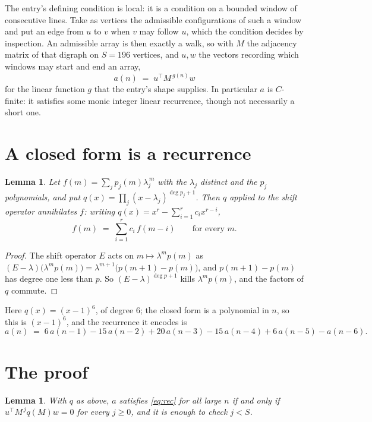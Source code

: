 \documentclass[11pt,a4paper]{article}
\theoremstyle{plain}
\newtheorem{lemma}[theorem]{Lemma}
\theoremstyle{definition}
\begin{document}
The entry's defining condition is local: it is a condition on a bounded window of consecutive lines. Take as vertices the
admissible configurations of such a window and put an edge from $u$ to $v$ when $v$ may
follow $u$, which the condition decides by inspection. An admissible array is then exactly a
walk, so with $M$ the adjacency matrix of that digraph on $S=196$ vertices, and $u,w$ the
vectors recording which windows may start and end an array,
\[
a(n)\;=\;u^{\!\top}M^{\,g(n)}w
\]
for the linear function $g$ that the entry's shape supplies. In particular $a$ is
$C$-finite: it satisfies some monic integer linear recurrence, though not necessarily a short
one.

\section{A closed form is a recurrence}

\begin{lemma}\label{lem:ann}
Let $f(m)=\sum_{j}p_j(m)\lambda_j^{\,m}$ with the $\lambda_j$ distinct and the $p_j$
polynomials, and put $q(x)=\prod_j(x-\lambda_j)^{\deg p_j+1}$. Then $q$ applied to the shift
operator annihilates $f$: writing $q(x)=x^{r}-\sum_{i=1}^{r}c_ix^{r-i}$,
\[
f(m)\;=\;\sum_{i=1}^{r}c_i\,f(m-i)\qquad\text{for every }m.
\]
\end{lemma}

\begin{proof}
The shift operator $E$ acts on $m\mapsto\lambda^{m}p(m)$ as
$(E-\lambda)\bigl(\lambda^{m}p(m)\bigr)=\lambda^{m+1}\bigl(p(m+1)-p(m)\bigr)$, and
$p(m+1)-p(m)$ has degree one less than $p$. So $(E-\lambda)^{\deg p+1}$ kills
$\lambda^{m}p(m)$, and the factors of $q$ commute.
\end{proof}

Here $q(x)=(x-1)^{6}$, of degree $6$; the closed form is a polynomial in $n$, so this is $(x-1)^{6}$, and the recurrence it encodes is
\begin{equation}\label{eq:rec}
a(n)\;=\;6\,a(n-1) - 15\,a(n-2) + 20\,a(n-3) - 15\,a(n-4) + 6\,a(n-5) - a(n-6).
\end{equation}

\section{The proof}

\begin{lemma}\label{lem:crit}
With $q$ as above, $a$ satisfies \eqref{eq:rec} for all large $n$ if and only if
$u^{\!\top}M^{\,j}q(M)w=0$ for every $j\ge0$, and it is enough to check $j<S$.
\end{lemma}
\end{document}
